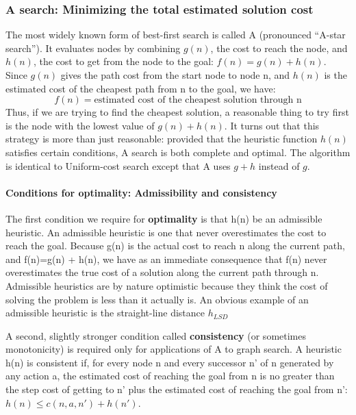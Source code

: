 \subsubsection{A\text{*} search: Minimizing the total estimated solution cost}
The most widely known form of best-first search is called A\text{*} (pronounced “A-star search”). It evaluates nodes by combining $g(n)$, the cost to reach the node, and $h(n)$, the cost to get from the node to the goal:
$f(n) = g(n) + h(n)$.
Since $g(n)$ gives the path cost from the start node to node n, and $h(n)$ is the estimated cost of the cheapest path from n to the goal, we have:
\[f(n) = \text{estimated cost of the cheapest solution through n}\]
Thus, if we are trying to find the cheapest solution, a reasonable thing to try first is the node with the lowest value of $g(n) + h(n)$. It turns out that this strategy is more than just reasonable: provided that the heuristic function $h(n)$ satisfies certain conditions, A\text{*} search is both complete and optimal. The algorithm is identical to Uniform-cost search except that A\text{*} uses $g + h$ instead of $g$.

\paragraph{Conditions for optimality: Admissibility and consistency}
The first condition we require for \textbf{optimality} is that h(n) be an admissible heuristic. An admissible heuristic is one that never overestimates the cost to reach the goal. Because g(n) is the actual cost to reach n along the current path, and f(n)=g(n) + h(n), we have as an immediate consequence that f(n) never overestimates the true cost of a solution along the current path through n.
Admissible heuristics are by nature optimistic because they think the cost of solving
the problem is less than it actually is.
An obvious example of an admissible heuristic is the straight-line distance $h_{LSD}$

A second, slightly stronger condition called  \textbf{consistency} (or sometimes monotonicity) is required only for applications of A\text{*} to graph search.
A heuristic h(n) is consistent if, for every node n and every successor n' of n generated by any action a, the estimated cost of reaching the goal from n is no greater than the step cost of getting to n' plus the estimated cost of reaching the goal from n': $h(n) \leq c(n, a, n') + h(n')$.

